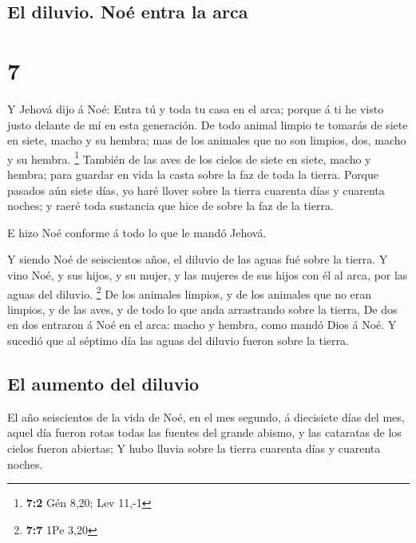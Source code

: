 \hypertarget{el-diluvio.-nouxe9-entra-la-arca}{%
\subsection{El diluvio. Noé entra la
arca}\label{el-diluvio.-nouxe9-entra-la-arca}}

\hypertarget{section-6}{%
\section{7}\label{section-6}}

 Y Jehová dijo á Noé: Entra tú y toda tu casa en el arca;
porque á ti he visto justo delante de mí en esta generación.
 De todo animal limpio te tomarás de siete en siete, macho
y su hembra; mas de los animales que no son limpios, dos, macho y su
hembra. \footnote{\textbf{7:2} Gén 8,20; Lev 11,-1} 
También de las aves de los cielos de siete en siete, macho y hembra;
para guardar en vida la casta sobre la faz de toda la tierra.
 Porque pasados aún siete días, yo haré llover sobre la
tierra cuarenta días y cuarenta noches; y raeré toda sustancia que hice
de sobre la faz de la tierra.

 E hizo Noé conforme á todo lo que le mandó Jehová.

 Y siendo Noé de seiscientos años, el diluvio de las aguas
fué sobre la tierra.  Y vino Noé, y sus hijos, y su mujer,
y las mujeres de sus hijos con él al arca, por las aguas del diluvio.
\footnote{\textbf{7:7} 1Pe 3,20}  De los animales limpios,
y de los animales que no eran limpios, y de las aves, y de todo lo que
anda arrastrando sobre la tierra,  De dos en dos entraron
á Noé en el arca: macho y hembra, como mandó Dios á Noé. 
Y sucedió que al séptimo día las aguas del diluvio fueron sobre la
tierra.

\hypertarget{el-aumento-del-diluvio}{%
\subsection{El aumento del diluvio}\label{el-aumento-del-diluvio}}

 El año seiscientos de la vida de Noé, en el mes segundo,
á diecisiete días del mes, aquel día fueron rotas todas las fuentes del
grande abismo, y las cataratas de los cielos fueron abiertas;
 Y hubo lluvia sobre la tierra cuarenta días y cuarenta
noches.

